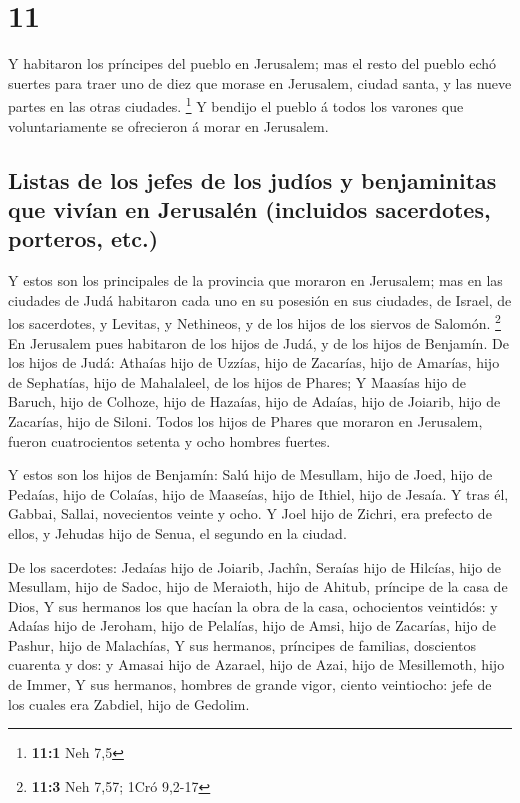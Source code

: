 \hypertarget{section-10}{%
\section{11}\label{section-10}}

 Y habitaron los príncipes del pueblo en Jerusalem; mas el
resto del pueblo echó suertes para traer uno de diez que morase en
Jerusalem, ciudad santa, y las nueve partes en las otras ciudades.
\footnote{\textbf{11:1} Neh 7,5}  Y bendijo el pueblo á
todos los varones que voluntariamente se ofrecieron á morar en
Jerusalem.

\hypertarget{listas-de-los-jefes-de-los-juduxedos-y-benjaminitas-que-vivuxedan-en-jerusaluxe9n-incluidos-sacerdotes-porteros-etc.}{%
\subsection{Listas de los jefes de los judíos y benjaminitas que vivían
en Jerusalén (incluidos sacerdotes, porteros,
etc.)}\label{listas-de-los-jefes-de-los-juduxedos-y-benjaminitas-que-vivuxedan-en-jerusaluxe9n-incluidos-sacerdotes-porteros-etc.}}

 Y estos son los principales de la provincia que moraron en
Jerusalem; mas en las ciudades de Judá habitaron cada uno en su posesión
en sus ciudades, de Israel, de los sacerdotes, y Levitas, y Nethineos, y
de los hijos de los siervos de Salomón. \footnote{\textbf{11:3} Neh
  7,57; 1Cró 9,2-17}  En Jerusalem pues habitaron de los
hijos de Judá, y de los hijos de Benjamín. De los hijos de Judá: Athaías
hijo de Uzzías, hijo de Zacarías, hijo de Amarías, hijo de Sephatías,
hijo de Mahalaleel, de los hijos de Phares;  Y Maasías hijo
de Baruch, hijo de Colhoze, hijo de Hazaías, hijo de Adaías, hijo de
Joiarib, hijo de Zacarías, hijo de Siloni.  Todos los hijos
de Phares que moraron en Jerusalem, fueron cuatrocientos setenta y ocho
hombres fuertes.

 Y estos son los hijos de Benjamín: Salú hijo de Mesullam,
hijo de Joed, hijo de Pedaías, hijo de Colaías, hijo de Maaseías, hijo
de Ithiel, hijo de Jesaía.  Y tras él, Gabbai, Sallai,
novecientos veinte y ocho.  Y Joel hijo de Zichri, era
prefecto de ellos, y Jehudas hijo de Senua, el segundo en la ciudad.

 De los sacerdotes: Jedaías hijo de Joiarib, Jachîn,
 Seraías hijo de Hilcías, hijo de Mesullam, hijo de Sadoc,
hijo de Meraioth, hijo de Ahitub, príncipe de la casa de Dios,
 Y sus hermanos los que hacían la obra de la casa,
ochocientos veintidós: y Adaías hijo de Jeroham, hijo de Pelalías, hijo
de Amsi, hijo de Zacarías, hijo de Pashur, hijo de Malachías,
 Y sus hermanos, príncipes de familias, doscientos cuarenta
y dos: y Amasai hijo de Azarael, hijo de Azai, hijo de Mesillemoth, hijo
de Immer,  Y sus hermanos, hombres de grande vigor, ciento
veintiocho: jefe de los cuales era Zabdiel, hijo de Gedolim.

